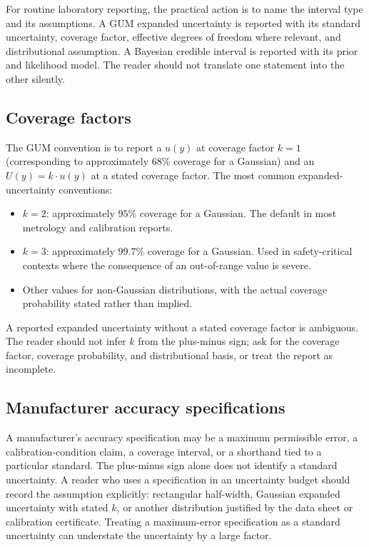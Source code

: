 For routine laboratory reporting, the practical action is to name
the interval type and its assumptions. A GUM expanded uncertainty is
reported with its standard uncertainty, coverage factor, effective
degrees of freedom where relevant, and distributional assumption. A
Bayesian credible interval is reported with its prior and likelihood
model. The reader should not translate one statement into the other
silently.

\subsection{Coverage factors}

The GUM convention is to report a 
$u(y)$ at coverage factor $k = 1$ (corresponding to approximately
$68\%$ coverage for a Gaussian) and an  $U(y) = k \cdot u(y)$ at a stated coverage factor.
The most common expanded-uncertainty conventions:

\begin{itemize}[leftmargin=*]
  \item $k = 2$: approximately $95\%$ coverage for a Gaussian.
    The default in most metrology and calibration reports.
  \item $k = 3$: approximately $99.7\%$ coverage for a Gaussian.
    Used in safety-critical contexts where the consequence of an
    out-of-range value is severe.
  \item Other values for non-Gaussian distributions, with the
    actual coverage probability stated rather than implied.
\end{itemize}

A reported expanded uncertainty without a stated coverage factor is
ambiguous. The reader should not infer $k$ from the plus-minus sign;
ask for the coverage factor, coverage probability, and distributional
basis, or treat the report as incomplete.

\subsection{Manufacturer accuracy specifications}

A manufacturer's accuracy specification may be a maximum permissible
error, a calibration-condition claim, a coverage interval, or a
shorthand tied to a particular standard. The plus-minus sign alone
does not identify a standard uncertainty. A reader who uses a
specification in an uncertainty budget should record the assumption
explicitly: rectangular half-width, Gaussian expanded uncertainty
with stated $k$, or another distribution justified by the data sheet
or calibration certificate. Treating a maximum-error specification
as a standard uncertainty can understate the uncertainty by a large
factor.

